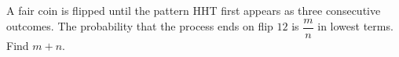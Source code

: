 A fair coin is flipped until the pattern HHT first appears as three consecutive outcomes. The probability that the process ends on flip $12$ is $\dfrac{m}{n}$ in lowest terms. Find $m+n$.
